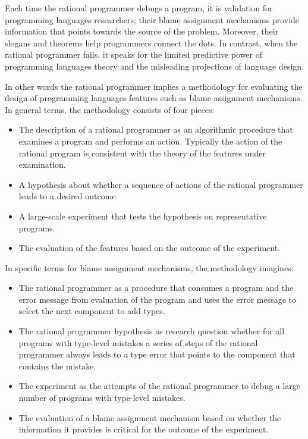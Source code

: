 
Each time the rational programmer debugs a program, it is validation for
programming languages researchers; their blame assignment mechanisms
provide information that points towards the source of the problem.
Moreover, their slogans and theorems help programmers connect the dots.
In contrast, when the rational programmer fails, it speaks for the limited
predictive power of programming languages theory and the misleading
projections of language design.

In other words the rational programmer implies a methodology for
evaluating the design of programming languages features such as blame
assignment mechanisms.  In general terms, the methodology consists of four
pieces:

\begin{itemize} 

 
  \item The description of a  rational programmer as an algorithmic
    procedure that examines a program and performs an action.  Typically
    the action of the rational program is consistent with the theory of
    the features under examination.

 
  \item A hypothesis about whether a sequence of actions of the rational
    programmer leads to a desired outcome.

  \item A large-scale experiment that tests the hypothesis on
    representative programs. 


  \item The evaluation of the features based on the outcome of the
    experiment.    

\end{itemize}

In specific terms for blame assignment mechanisms, the methodology
imagines:  

\begin{itemize}
 
  \item The rational programmer as a procedure that consumes a program and
    the error message from evaluation of the program and uses the error
    message to select the next component to add types.

  \item The rational programmer hypothesis as  research question whether
    for all programs with type-level mistakes a series of steps of the
    rational programmer always leads to a type error that points to the
    component that contains the mistake. 

  \item The experiment as the attempts of the rational programmer to debug
    a large number of programs with type-level mistakes. 


  \item The evaluation of a blame assignment mechanism based on whether
    the information it provides is critical for the outcome of the
    experiment.  

\end{itemize}




